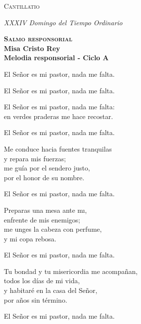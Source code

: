 \documentclass[letterpaper]{report}
\begin{document}
    \begin{titlepage}
        \centering
        \vspace*{8cm}
        { \scshape \Huge Cantillatio \par}
        \vspace{1cm}
        { \itshape \Large XXXIV Domingo del Tiempo Ordinario \par}
        \vfill
    \end{titlepage}
    \clearpage
    
    \begin{center}
        {\scshape \Huge {\bfseries Salmo responsorial}} \\
        {\LARGE {\bfseries Misa Cristo Rey}} \\
        {\Large {\bfseries Melodia responsorial - Ciclo A}}
    \end{center}
    
    El Se\~nor es mi pastor, nada me falta.
    
    El Se\~nor es mi pastor, nada me falta.
    
    El Se\~nor es mi pastor, nada me falta:\\
    en verdes praderas me hace recostar.
    
    El Se\~nor es mi pastor, nada me falta.
    
    Me conduce hacia fuentes tranquilas\\
    y repara mis fuerzas;\\
    me gu\'ia por el sendero justo,\\
    por el honor de su nombre.
    
    El Se\~nor es mi pastor, nada me falta.
    
    Preparas una mesa ante m\i,\\
    enfrente de mis enemigos;\\
    me unges la cabeza con perfume,\\
    y mi copa rebosa.

    El Se\~nor es mi pastor, nada me falta.

    Tu bondad y tu misericordia me acompa\~nan,\\
    todos los d\'ias de mi vida,\\
    y habitar\'e en la casa del Se\~nor,\\
    por a\~nos sin t\'ermino.

    El Se\~nor es mi pastor, nada me falta.
    \clearpage
    
\end{document}
